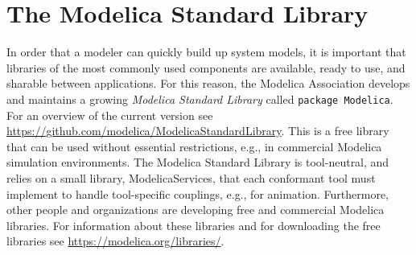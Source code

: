 \chapter{The Modelica Standard Library}\label{the-modelica-standard-library}

In order that a modeler can quickly build up system models, it is important that libraries of the most commonly used components are available, ready to use, and sharable between applications.
For this reason, the Modelica Association develops and maintains a growing \emph{Modelica Standard Library} called \lstinline!package Modelica!.
For an overview of the current version see \url{https://github.com/modelica/ModelicaStandardLibrary}.
This is a free library that can be used without essential restrictions, e.g., in commercial Modelica simulation environments.
The Modelica Standard Library is tool-neutral, and relies on a small library, ModelicaServices, that each conformant tool must implement to handle tool-specific couplings, e.g., for animation.
Furthermore, other people and organizations are developing free and commercial Modelica libraries.
For information about these libraries and for downloading the free libraries see \url{https://modelica.org/libraries/}.
